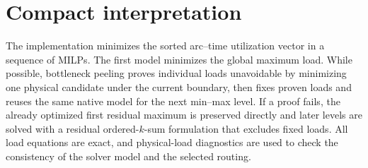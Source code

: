\documentclass[11pt,a4paper]{article}
\begin{document}
\section{Compact interpretation}

The implementation minimizes the sorted arc--time utilization vector in a
sequence of MILPs. The first model minimizes the global maximum load. While
possible, bottleneck peeling proves individual loads unavoidable by minimizing
one physical candidate under the current boundary, then fixes proven loads and
reuses the same native model for the next min--max level. If a proof fails, the
already optimized first residual maximum is preserved directly and later levels
are solved with a residual ordered-$k$-sum formulation that excludes fixed
loads. All load equations are exact, and physical-load diagnostics are used to
check the consistency of the solver model and the selected routing.
\end{document}
